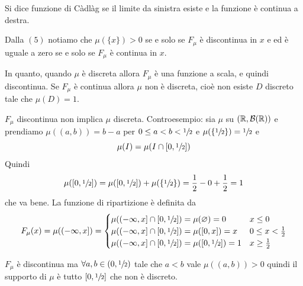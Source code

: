 \documentclass[a4paper]{article}
\begin{document}
Si dice funzione di Càdlàg
se il limite da sinistra esiste
e la funzione è continua a destra.

\begin{snippetcorollary}{}
    Dalla \((5)\) notiamo che \(\mu(\{x\}) > 0\)
    se e solo se \(F_\mu\) è discontinua in \(x\) e
    ed è uguale a zero se e solo se \(F_\mu\) è continua in \(x\).
\end{snippetcorollary}

In quanto, quando \(\mu\) è discreta allora \(F_\mu\) è una funzione a scala,
e quindi discontinua. Se \(F_\mu\) è continua allora \(\mu\)
non è discreta, cioè non esiste \(D\) discreto tale che \(\mu(D) = 1\).

\begin{snippetnote}{}
    \(F_\mu\) discontinua non implica \(\mu\) discreta.
    Controesempio:
    sia \(\mu\) su \((\mathbb{R}, \mathcal B(\mathbb{R}))\)
    e prendiamo \(\mu((a,b)) = b-a\)
    per \(0 \leq a < b < \sfrac12\)
    e \(\mu(\{\sfrac12\}) = \sfrac12\) e \[
        \mu(I) = \mu(I \cap [0, \sfrac12])
    \]
    Quindi
    \[
        \mu([0,\sfrac12]) = \mu([0,\sfrac12]) + \mu(\{\sfrac12\})
        = \frac12 - 0 + \frac12 = 1
    \]
    che va bene. La funzione di ripartizione è definita da
    \[
        F_\mu(x) = \mu((-\infty, x]) =
        \begin{cases}
            \mu((-\infty, x] \cap [0, \sfrac12]) = \mu(\varnothing) = 0 & x \leq 0 \\
            \mu((-\infty, x] \cap [0, \sfrac12]) = \mu([0,x]) = x & 0 \leq x < \frac12 \\
            \mu((-\infty, x] \cap [0, \sfrac12]) = \mu([0,\sfrac12]) = 1 & x \geq \frac12
        \end{cases}
    \]
    \begin{figure}
    \end{figure}
    \(F_\mu\) è discontinua ma \(\forall a,b \in (0, \sfrac12)\)
    tale che \(a<b\) vale \(\mu((a,b)) > 0\) quindi il supporto di \(\mu\)
    è tutto \([0,\sfrac12]\) che non è discreto.
    \wrapfill
\end{snippetnote}
\end{document}
